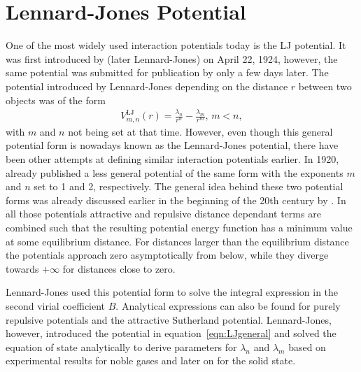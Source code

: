 \section{Lennard-Jones Potential}
\label{sec:LennardJones}

One of the most widely used interaction potentials today is the \ac{LJ}
potential. It was first introduced by
\citeauthor{Jones_DeterminationMolecularFields_1924} (later Lennard-Jones) on
April 22, 1924\autocite{Jones_DeterminationMolecularFields_1924}, however, the
same potential was submitted for publication by
\citeauthor{Simon_KristallstrukturArgons_1924} only a few days
later.\autocite{Simon_KristallstrukturArgons_1924} The potential introduced by
Lennard-Jones depending on the distance $r$ between two objects was of the form
%
\begin{align}
    V_{m,n}^\text{LJ}(r)=\frac{\lambda_n}{r^n}-\frac{\lambda_m}{r^m},\, m<n,\label{eqn:LJgeneral}
\end{align}
%
with $m$ and $n$ not being set at that time. However, even though this general
potential form is nowadays known as the Lennard-Jones potential, there have
been other attempts at defining similar interaction
potentials earlier. In 1920,
\citeauthor{Kratzer_ultrarotenRotationsspektrenHalogenwasserstoffe_1920}\autocite{Kratzer_ultrarotenRotationsspektrenHalogenwasserstoffe_1920}
already published a less general potential of the same form with the exponents
$m$ and $n$ set to 1 and 2, respectively. The general idea behind these two
potential forms was already discussed earlier in the beginning of the 20th
century by
\citeauthor{Mie_ZurkinetischenTheorie_1903}\autocite{Mie_ZurkinetischenTheorie_1903}.
In all those potentials attractive and repulsive distance dependant terms are
combined such that the resulting potential energy function has a minimum value
at some equilibrium distance. For distances larger than the equilibrium distance
the potentials approach zero asymptotically from below, while they diverge
towards $+\infty$ for distances close to zero.

Lennard-Jones used this potential form to solve the integral expression in the
second virial coefficient $B$. Analytical expressions can also be found for
purely repulsive potentials and the attractive Sutherland potential.
Lennard-Jones, however, introduced the potential in
equation~\eqref{eqn:LJgeneral} and solved the equation of state analytically to
derive parameters for $\lambda_n$ and $\lambda_m$ based on experimental results
for noble gases\autocite{Jones_DeterminationMolecularFields_1924} and later on
for the solid state.\autocite{Jones_calculationcertaincrystal_1925}

